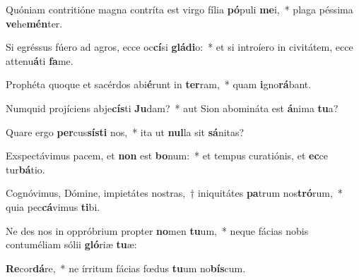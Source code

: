\item Quóniam contritióne magna contríta est virgo fília \textbf{pó}puli \textbf{me}i,~* plaga péssima \textbf{ve}he\textbf{mén}ter.
\item Si egréssus fúero ad agros, ecce oc\textbf{cí}si \textbf{glá}\textbf{di}o:~* et si introíero in civitátem, ecce attenu\textbf{á}ti \textbf{fa}me.
\item Prophéta quoque et sacérdos abi\textbf{é}runt in \textbf{ter}ram,~* quam \textbf{i}gno\textbf{rá}bant.
\item Numquid projíciens abje\textbf{cís}ti \textbf{Ju}dam?~* aut Sion abomináta est \textbf{á}nima \textbf{tu}a?
\item Quare ergo \textbf{per}cus\textbf{sís}\textbf{ti} nos,~* ita ut \textbf{nul}la sit \textbf{sá}nitas?
\item Exspectávimus pacem, et \textbf{non} est \textbf{bo}num:~* et tempus curatiónis, et \textbf{ec}ce tur\textbf{bá}tio.
\item Cognóvimus, Dómine, impietátes nostras,~† iniquitátes \textbf{pa}trum nos\textbf{tró}rum,~* quia pec\textbf{cá}vimus \textbf{ti}bi.
\item Ne des nos in oppróbrium propter \textbf{no}men \textbf{tu}um,~* neque fácias nobis contuméliam sólii \textbf{gló}riæ \textbf{tu}æ:
\item \textbf{Re}cor\textbf{dá}re,~* ne írritum fácias fœdus \textbf{tu}um no\textbf{bís}cum.
